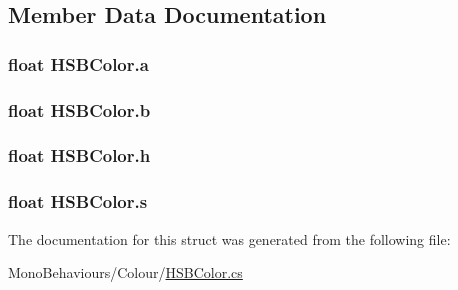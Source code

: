 \subsection{Member Data Documentation}
\subsubsection[{\texorpdfstring{a}{a}}]{\setlength{\rightskip}{0pt plus 5cm}float H\+S\+B\+Color.\+a}\hypertarget{struct_h_s_b_color_a39be022c45e7139a000e5979c6a46c7a}{}\label{struct_h_s_b_color_a39be022c45e7139a000e5979c6a46c7a}
\subsubsection[{\texorpdfstring{b}{b}}]{\setlength{\rightskip}{0pt plus 5cm}float H\+S\+B\+Color.\+b}\hypertarget{struct_h_s_b_color_ac583842adef56d674979abb714b91823}{}\label{struct_h_s_b_color_ac583842adef56d674979abb714b91823}
\subsubsection[{\texorpdfstring{h}{h}}]{\setlength{\rightskip}{0pt plus 5cm}float H\+S\+B\+Color.\+h}\hypertarget{struct_h_s_b_color_a7379a79483a187a75bee618f6c453d35}{}\label{struct_h_s_b_color_a7379a79483a187a75bee618f6c453d35}
\subsubsection[{\texorpdfstring{s}{s}}]{\setlength{\rightskip}{0pt plus 5cm}float H\+S\+B\+Color.\+s}\hypertarget{struct_h_s_b_color_a11db1b5f23ae77f453a43a94ed1581d3}{}\label{struct_h_s_b_color_a11db1b5f23ae77f453a43a94ed1581d3}


The documentation for this struct was generated from the following file\+:\begin{DoxyCompactItemize}
\item 
Mono\+Behaviours/\+Colour/\hyperlink{_h_s_b_color_8cs}{H\+S\+B\+Color.\+cs}\end{DoxyCompactItemize}
